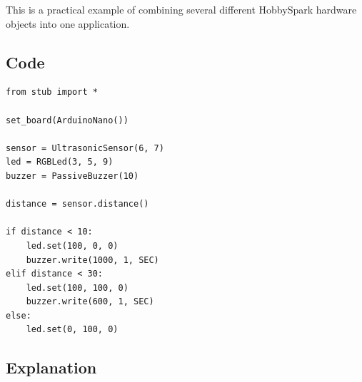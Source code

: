 This is a practical example of combining several different HobbySpark
hardware objects into one application.

\subsection{Code}

\begin{lstlisting}
from stub import *

set_board(ArduinoNano())

sensor = UltrasonicSensor(6, 7)
led = RGBLed(3, 5, 9)
buzzer = PassiveBuzzer(10)

distance = sensor.distance()

if distance < 10:
    led.set(100, 0, 0)
    buzzer.write(1000, 1, SEC)
elif distance < 30:
    led.set(100, 100, 0)
    buzzer.write(600, 1, SEC)
else:
    led.set(0, 100, 0)
\end{lstlisting}

\subsection{Explanation}

